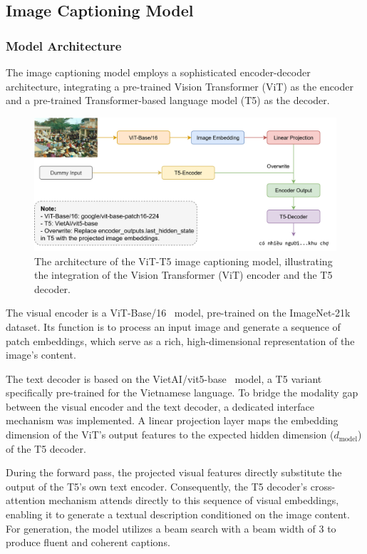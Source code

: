 \subsection{Image Captioning Model}

\subsubsection{Model Architecture}
The image captioning model employs a sophisticated encoder-decoder architecture, integrating a pre-trained Vision Transformer (ViT) as the encoder and a pre-trained Transformer-based language model (T5) as the decoder.

\begin{figure}[H]
  \centering
  \includegraphics[width=\textwidth]{image/img-captioning-archi.png}
  \caption{The architecture of the ViT-T5 image captioning model, illustrating the integration of the Vision Transformer (ViT) encoder and the T5 decoder.}
  \label{fig:img_cap_archi}
\end{figure}



The visual encoder is a ViT-Base/16~\cite{google-vit-base-patch16-224} model, pre-trained on the ImageNet-21k dataset. Its function is to process an input image and generate a sequence of patch embeddings, which serve as a rich, high-dimensional representation of the image's content.

The text decoder is based on the VietAI/vit5-base~\cite{phan-etal-2022-vit5} model, a T5 variant specifically pre-trained for the Vietnamese language. To bridge the modality gap between the visual encoder and the text decoder, a dedicated interface mechanism was implemented. A linear projection layer maps the embedding dimension of the ViT's output features to the expected hidden dimension ($d_{\text{model}}$) of the T5 decoder.

During the forward pass, the projected visual features directly substitute the output of the T5's own text encoder. Consequently, the T5 decoder's cross-attention mechanism attends directly to this sequence of visual embeddings, enabling it to generate a textual description conditioned on the image content. For generation, the model utilizes a beam search with a beam width of 3 to produce fluent and coherent captions.

